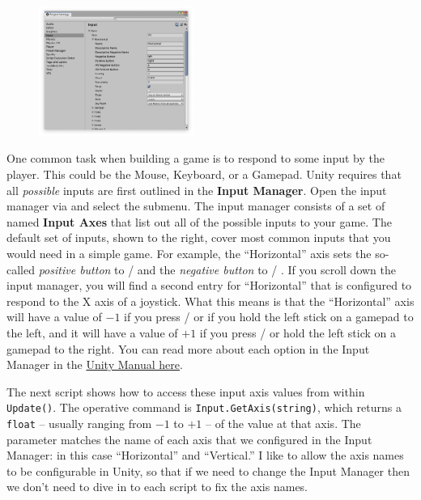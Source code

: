 \documentclass[11pt]{article}
\begin{document}
\begin{figure}
    \vspace*{-3.5em}
    \includegraphics[width=0.45\textwidth]{input-manager}
\end{figure}
One common task when building a game is to respond to some input by the player.  This could be
the Mouse, Keyboard, or a Gamepad.  Unity requires that all \textit{possible} inputs are first
outlined in the \textbf{Input Manager}.  Open the input manager via 
and select the  submenu.  The input manager consists of a set of named \textbf{Input Axes}
that list out all of the possible inputs to your game.  The default set of inputs, shown to the right,
cover most common inputs that you would need in a simple game.  For example, the ``Horizontal'' axis
sets the so-called \textit{positive button} to \keys{\arrowkey{>}} /  and the \textit{negative
button} to \keys{\arrowkey{<}} / .  If you scroll down the input manager, you will find a
second entry for ``Horizontal'' that is configured to respond to the X axis of a joystick.  What this
means is that the ``Horizontal'' axis will have a value of $-1$ if you press \keys{\arrowkey{<}} / 
or if you hold the left stick on a gamepad to the left, and it will have a value of $+1$ if you press
\keys{\arrowkey{>}} /  or hold the left stick on a gamepad to the right.  You can read more
about each option in the Input Manager in the \href{https://docs.unity3d.com/Manual/class-InputManager.html}{Unity Manual here}.

The next script shows how to access these input axis values from within \lstinline|Update()|.  The
operative command is \lstinline|Input.GetAxis(string)|, which returns a \lstinline|float| -- usually
ranging from $-1$ to $+1$ -- of the value at that axis.  The parameter matches the name of each axis
that we configured in the Input Manager: in this case ``Horizontal'' and ``Vertical.''  I like to
allow the axis names to be configurable in Unity, so that if we need to change the Input Manager
then we don't need to dive in to each script to fix the axis names.
\end{document}
